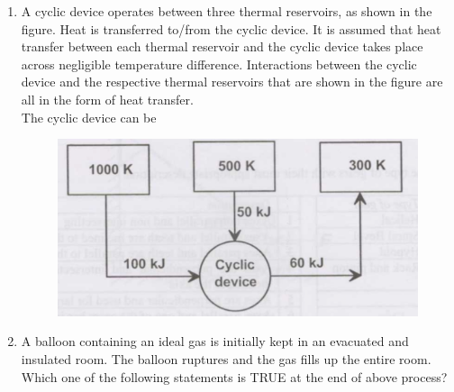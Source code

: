 \documentclass[journal,12pt,onecolumn]{IEEEtran}
\begin{document}
\begin{enumerate}
    \item A cyclic device operates between three thermal reservoirs, as shown in the figure. Heat is transferred to/from the cyclic device. It is assumed that heat transfer between each thermal reservoir and the cyclic device takes place across negligible temperature difference. Interactions between the cyclic device and the respective thermal reservoirs that are shown in the figure are all in the form of heat transfer.\\
          The cyclic device can be

          \begin{figure}[H]
              \centering
              \includegraphics[scale=0.3]{q47}
              \caption{}
              \label{q47}
          \end{figure}

          \begin{enumerate}
          \end{enumerate}

    \item A balloon containing an ideal gas is initially kept in an evacuated and insulated room. The balloon ruptures and the gas fills up the entire room. Which one of the following statements is TRUE at the end of above process?\\


\end{enumerate}
\end{document}
